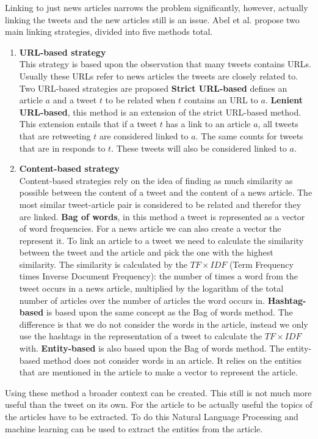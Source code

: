 \documentclass{article}
\begin{document}
Linking to just news articles narrows the problem significantly, however, actually linking the tweets and the new articles still is an issue. Abel et al. propose two main linking strategies, divided into five methods total.
\begin{enumerate}
\item \textbf{URL-based strategy}\\
This strategy is based upon the observation that many tweets contains URLs. Usually these URLs refer to news articles the tweets are closely related to. Two URL-based strategies are proposed
	\subitem \textbf{Strict URL-based} defines an article $a$ and a tweet $t$ to be related when $t$ contains an URL to $a$.
	\subitem \textbf{Lenient URL-based}, this method is an extension of the strict URL-based method. This extension entails that if a tweet $t$ has a link to an article $a$, all tweets that are retweeting $t$ are considered linked to $a$. The same counts for tweets that are in responds to $t$. These tweets will also be considered linked to $a$.
\item \textbf{Content-based strategy}\\
Content-based strategies rely on the idea of finding as much similarity as possible between the content of a tweet and the content of a news article. The most similar tweet-article pair is considered to be related and therefor they are linked.
	\subitem \textbf{Bag of words}, in this method a tweet is represented as a vector of word frequencies. For a news article we can also create a vector the represent it. To link an article to a tweet we need to calculate the similarity between the tweet and the article and pick the one with the highest similarity. The similarity is calculated by the $TF \times IDF$ (Term Frequency times Inverse Document Frequency): the number of times a word from the tweet occurs in a news article, multiplied by the logarithm of the total number of articles over the number of articles the word occurs in. \cite{tfidf}
	\subitem \textbf{Hashtag-based} is based upon the same concept as the Bag of words method. The difference is that we do not consider the words in the article, instead we only use the hashtags in the representation of a tweet to calculate the $TF \times IDF$ with.
	\subitem \textbf{Entity-based} is also based upon the Bag of words method. The entity-based method does not consider words in an article. It relies on the entities that are mentioned in the article to make a vector to represent the article. 
\end{enumerate}
Using these method a broader context can be created. This still is not much more useful than the tweet on its own. For the article to be actually useful the topics of the articles have to be extracted. To do this Natural Language Processing and machine learning can be used to extract the entities from the article.  
\end{document}
